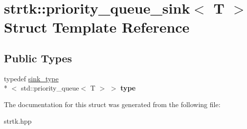 \hypertarget{structstrtk_1_1priority__queue__sink}{\section{strtk\-:\-:priority\-\_\-queue\-\_\-sink$<$ T $>$ Struct Template Reference}
\label{structstrtk_1_1priority__queue__sink}
}
\subsection*{Public Types}
\begin{DoxyCompactItemize}
\item 
\hypertarget{structstrtk_1_1priority__queue__sink_ade0288bfe1ac5e629da5fca2a370fc1b}{typedef \hyperlink{classstrtk_1_1sink__type}{sink\-\_\-type}\\*
$<$ std\-::priority\-\_\-queue$<$ T $>$ $>$ {\bfseries type}}\label{structstrtk_1_1priority__queue__sink_ade0288bfe1ac5e629da5fca2a370fc1b}

\end{DoxyCompactItemize}


The documentation for this struct was generated from the following file\-:\begin{DoxyCompactItemize}
\item 
strtk.\-hpp\end{DoxyCompactItemize}
